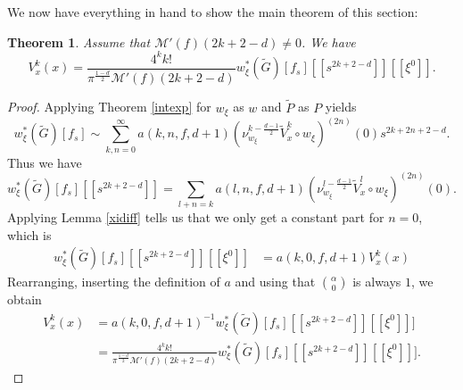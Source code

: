 \documentclass[11pt]{article}
\def\insum#1{\sum\limits_{#1=0}^\infty}
\def\M{\mathcal{M}}
\newtheorem{thm}[df]{Theorem}
\begin{document}
We now have everything in hand to show the main theorem of this section:
\begin{thm}
	\label{prodmain}
	Assume that $\M '(f)(2k+2-d)\neq 0$. We have
	\[V^k_x(x)=\frac{4^k k!}{\pi^{\frac{1-d}{2}}\M'(f)(2k+2-d)}w_\xi^*(\tilde G)[f_s][[s^{2k+2-d}]][[\xi^0]].\]
\end{thm}
\begin{proof}
	Applying Theorem \ref{intexp} for $w_\xi$ as $w$ and $\tilde P$ as $P$ yields
	\[w_\xi^*(\tilde G)[f_s]\sim\insum{k,n} a(k,n,f,d+1)(\nu_{w_\xi}^{k-\frac{d-1}{2}} \tilde V^k_x\circ w_\xi)^{(2n)}(0)s^{2k+2n+2-d}.\]
	Thus we have
	\[w_\xi^*(\tilde G)[f_s][[s^{2k+2-d}]]=\sum\limits_{l+n=k}a(l,n,f,d+1)(\nu_{w_\xi}^{l-\frac{d-1}{2}} \tilde V^l_x\circ w_\xi)^{(2n)}(0).\]
	Applying Lemma \ref{xidiff} tells us that we only get a constant part for $n=0$, which is
	\begin{align*}
		w_\xi^*(\tilde G)[f_s][[s^{2k+2-d}]][[\xi^0]]&=a(k,0,f,d+1)V^k_x(x)
	\end{align*}
	Rearranging, inserting the definition of $a$ and using that $\binom{\alpha}{0}$ is always $1$, we obtain
	\begin{align*}
		V^k_x(x)&=a(k,0,f,d+1)^{-1}w_\xi^*(\tilde G)[f_s][[s^{2k+2-d}]][[\xi^0]]] \\
		&=\frac{4^k k!}{\pi^{\frac{1-d}{2}}\M'(f)(2k+2-d)}w_\xi^*(\tilde G)[f_s][[s^{2k+2-d}]][[\xi^0]]].
	\end{align*}
\end{proof}
\end{document}
